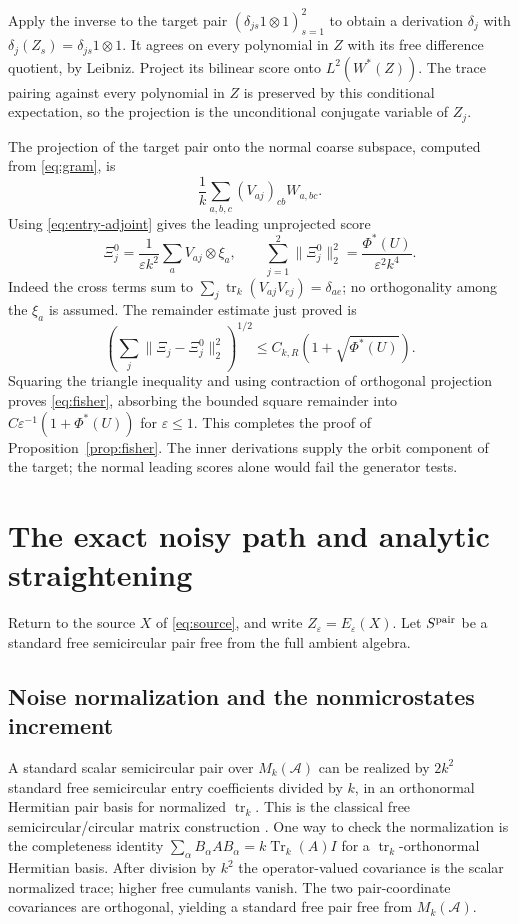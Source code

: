 \documentclass[11pt]{article}
\theoremstyle{definition}\newtheorem{definition}[theorem]{Definition}
\theoremstyle{remark}\newtheorem{remark}[theorem]{Remark}
\DeclareMathOperator{\Tr}{Tr}\DeclareMathOperator{\tr}{tr}
\newcommand{\eps}{\varepsilon}\newcommand{\id}{\mathrm{id}}
\begin{document}
Apply the inverse to the target pair
$(\delta_{js}1\otimes1)_{s=1}^2$ to obtain a derivation $\delta_j$
with $\delta_j(Z_s)=\delta_{js}1\otimes1$. It agrees on every
polynomial in $Z$ with its free difference quotient, by Leibniz.
Project its bilinear score onto $L^2(W^*(Z))$. The trace pairing
against every polynomial in $Z$ is preserved by this conditional
expectation, so the projection is the unconditional conjugate variable
of $Z_j$.

The projection of the target pair onto the normal coarse subspace,
computed from \eqref{eq:gram}, is
\[
 \frac1k\sum_{a,b,c}(V_{aj})_{cb}W_{a,bc}.
\]
Using \eqref{eq:entry-adjoint} gives the leading unprojected score
\begin{equation}\label{eq:leading-score}
 \Xi_j^0=\frac1{\eps k^2}\sum_a V_{aj}\otimes\xi_a,
 \qquad
 \sum_{j=1}^2\|\Xi_j^0\|_2^2
 =\frac{\Phi^*(U)}{\eps^2k^4}.
\end{equation}
Indeed the cross terms sum to
$\sum_j\tr_k(V_{aj}V_{ej})=\delta_{ae}$; no orthogonality among the
$\xi_a$ is assumed. The remainder estimate just proved is
\[
 \left(\sum_j\|\Xi_j-\Xi_j^0\|_2^2\right)^{1/2}
 \leq C_{k,R}(1+\sqrt{\Phi^*(U)}).
\]
Squaring the triangle inequality and using contraction of orthogonal
projection proves \eqref{eq:fisher}, absorbing the bounded square
remainder into $C\eps^{-1}(1+\Phi^*(U))$ for $\eps\leq1$.
This completes the proof of Proposition~\ref{prop:fisher}.
The inner derivations supply the orbit component of the target;
the normal leading scores alone would fail the generator tests.

\section{The exact noisy path and analytic straightening}
\label{sec:coupling}
Return to the source $X$ of \eqref{eq:source}, and write
$Z_\eps=E_\eps(X)$. Let $S^{\rm pair}$ be a standard free
semicircular pair free from the full ambient algebra.

\subsection{Noise normalization and the nonmicrostates increment}
A standard scalar semicircular pair over $M_k(\mathcal A)$ can be
realized by $2k^2$ standard free semicircular entry coefficients divided
by $k$, in an orthonormal Hermitian pair basis for normalized $\tr_k$.
This is the classical free semicircular/circular matrix construction
\cite{Vmatrix}. One way to check the normalization is the completeness
identity $\sum_\alpha B_\alpha A B_\alpha=k\Tr_k(A)I$ for a
$\tr_k$-orthonormal Hermitian basis. After division by $k^2$ the
operator-valued covariance is the scalar normalized trace; higher
free cumulants vanish. The two pair-coordinate covariances are
orthogonal, yielding a standard free pair free from $M_k(\mathcal A)$.
\end{document}
